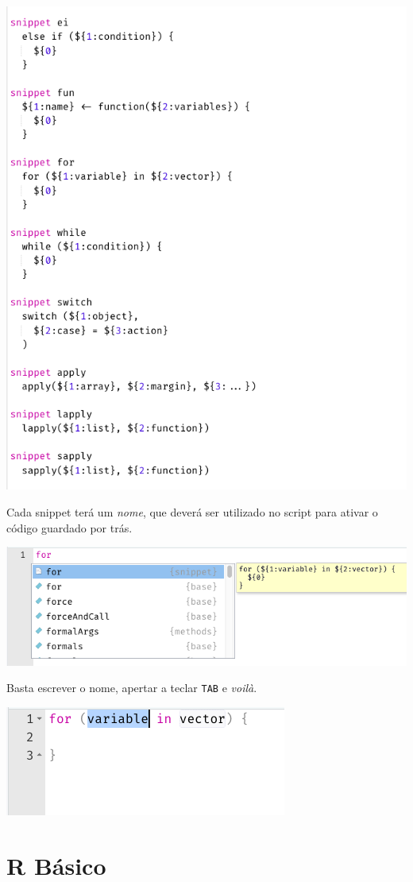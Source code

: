 \documentclass[
]{book}
\begin{document}
\begin{center}\includegraphics[width=0.7\linewidth]{assets/img/rstudio/snippets} \end{center}

Cada snippet terá um \emph{nome}, que deverá ser utilizado no script para ativar o código guardado por trás.

\begin{center}\includegraphics[width=0.6\linewidth]{assets/img/rstudio/snippet_for} \end{center}

Basta escrever o nome, apertar a teclar \texttt{TAB} e \emph{voilà}.

\begin{center}\includegraphics[width=0.4\linewidth]{assets/img/rstudio/snippet_for_resultado} \end{center}

\hypertarget{r-base}{%
\chapter{R Básico}\label{r-base}}
\end{document}
